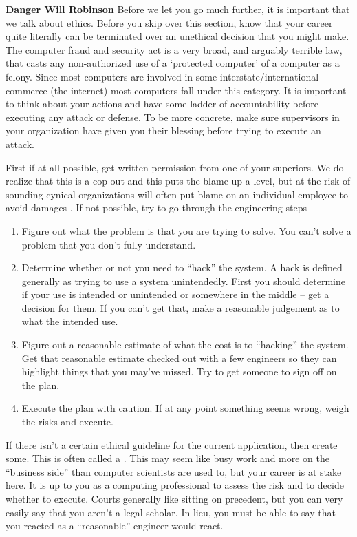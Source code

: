 \textbf{Danger Will Robinson} Before we let you go much further, it is important that we talk about ethics.
Before you skip over this section, know that your career quite literally can be terminated over an unethical decision that you might make.
The computer fraud and security act is a very broad, and arguably terrible law, that casts any non-authorized use of a `protected computer' of a computer as a felony.
Since most computers are involved in some interstate/international commerce (the internet) most computers fall under this category.
It is important to think about your actions and have some ladder of accountability before executing any attack or defense.
To be more concrete, make sure supervisors in your organization have given you their blessing before trying to execute an attack.

First if at all possible, get written permission from one of your superiors.
We do realize that this is a cop-out and this puts the blame up a level, but at the risk of sounding cynical organizations will often put blame on an individual employee to avoid damages .
If not possible, try to go through the engineering steps

\begin{enumerate}
\item Figure out what the problem is that you are trying to solve.
  You can't solve a problem that you don't fully understand.
\item Determine whether or not you need to ``hack'' the system.
  A hack is defined generally as trying to use a system unintendedly.
  First you should determine if your use is intended or unintended or somewhere in the middle -- get a decision for them.
  If you can't get that, make a reasonable judgement as to what the intended use.
\item Figure out a reasonable estimate of what the cost is to ``hacking'' the system.
  Get that reasonable estimate checked out with a few engineers so they can highlight things that you may've missed.
  Try to get someone to sign off on the plan.
\item Execute the plan with caution.
  If at any point something seems wrong, weigh the risks and execute.
\end{enumerate}

If there isn't a certain ethical guideline for the current application, then create some.
This is often called a .
This may seem like busy work and more on the ``business side'' than computer scientists are used to, but your career is at stake here.
It is up to you as a computing professional to assess the risk and to decide whether to execute.
Courts generally like sitting on precedent, but you can very easily say that you aren't a legal scholar.
In lieu, you must be able to say that you reacted as a ``reasonable'' engineer would react.

